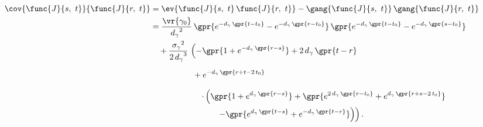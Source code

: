 \begin{align}
    \cov{\func{J}{s,\ t}}{\func{J}{r,\ t}} &= \ev{\func{J}{s,\ t}\,\func{J}{r,\ t}} - \gang{\func{J}{s,\ t}}\,\gang{\func{J}{r,\ t}} \nonumber \\
    	&= \frac{\vr{\gamma_0}}{{d_{\gamma}}^2}\,\gpr{e^{-d_{\gamma}\,\gpr{t - t_0}} - e^{-d_{\gamma}\,\gpr{r - t_0}}}\,\gpr{e^{-d_{\gamma}\,\gpr{t - t_0}} - e^{-d_{\gamma}\,\gpr{s - t_0}}}  \nonumber \\
    		&\quad + \frac{{\sigma_{\gamma}}^2}{{2\,d_{\gamma}}^{3}}\,\left( -\gpr{1 + e^{-d_{\gamma}\,\gpr{r - s}}} + 2\,d_{\gamma}\,\gpr{t - r} \right. \nonumber \\
    		&\phantom{+ \frac{{\sigma_{\gamma}}^2}{{2\,d_{\gamma}}^{3}}}\qquad + e^{-d_{\gamma}\,\gpr{r + t - 2\,t_0}} \nonumber \\
    		&\qquad\qquad\qquad  \left. \cdot \left( \gpr{1 + e^{d_{\gamma}\,\gpr{r - s}}} + \gpr{e^{2\,d_{\gamma}\,\gpr{r - t_0}} + e^{d_{\gamma}\,\gpr{r + s - 2\,t_0}}} \right. \right. \nonumber \\
    		&\qquad\qquad\qquad\qquad \left.\left. - \gpr{e^{d_{\gamma}\,\gpr{t - s}} + e^{-d_{\gamma}\,\gpr{t - r}}} \right) \right). \label{eqn:cov_Jst_Jrt_s_le_r}
\end{align}